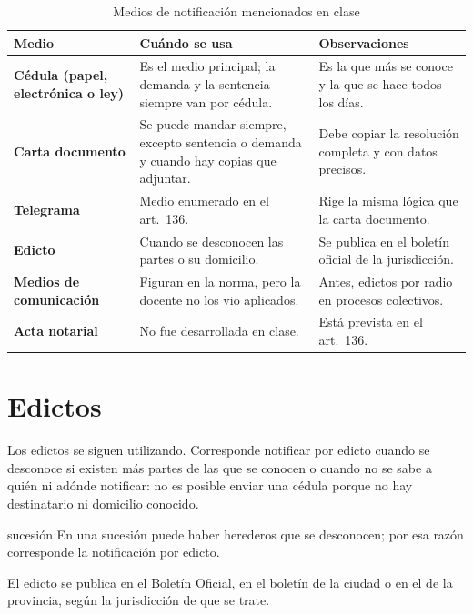 \documentclass[12pt,oneside]{book}
\begin{document}
\begin{table}[H]
\centering
\caption{Medios de notificación mencionados en clase}
\begin{tabularx}{\textwidth}{L{0.20\textwidth} Y Y}
\toprule
\textbf{Medio} & \textbf{Cuándo se usa} & \textbf{Observaciones} \\
\midrule
\textbf{Cédula (papel, electrónica o ley)} & Es el medio principal; la demanda y la sentencia siempre van por cédula. & Es la que más se conoce y la que se hace todos los días. \\
\addlinespace
\textbf{Carta documento} & Se puede mandar siempre, excepto sentencia o demanda y cuando hay copias que adjuntar. & Debe copiar la resolución completa y con datos precisos. \\
\addlinespace
\textbf{Telegrama} & Medio enumerado en el art.\ 136. & Rige la misma lógica que la carta documento. \\
\addlinespace
\textbf{Edicto} & Cuando se desconocen las partes o su domicilio. & Se publica en el boletín oficial de la jurisdicción. \\
\addlinespace
\textbf{Medios de comunicación} & Figuran en la norma, pero la docente no los vio aplicados. & Antes, edictos por radio en procesos colectivos. \\
\addlinespace
\textbf{Acta notarial} & No fue desarrollada en clase. & Está prevista en el art.\ 136. \\
\bottomrule
\end{tabularx}
\end{table}

\section{Edictos}

Los edictos se siguen utilizando. Corresponde notificar por edicto cuando se desconoce si existen más partes de las que se conocen o cuando no se sabe a quién ni adónde notificar: no es posible enviar una cédula porque no hay destinatario ni domicilio conocido.

\begin{example}{sucesión}
En una sucesión puede haber herederos que se desconocen; por esa razón corresponde la notificación por edicto.
\end{example}

El edicto se publica en el Boletín Oficial, en el boletín de la ciudad o en el de la provincia, según la jurisdicción de que se trate.
\end{document}
